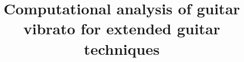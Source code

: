 \documentclass{nime-alternate} %
\begin{document}


\title{Computational analysis of guitar vibrato for extended guitar techniques}

%
%
%
\label{key}%
%
\end{document}
